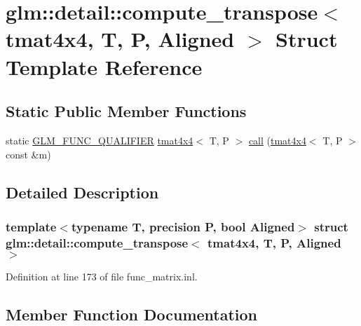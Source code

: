 \hypertarget{structglm_1_1detail_1_1compute__transpose_3_01tmat4x4_00_01_t_00_01_p_00_01_aligned_01_4}{}\section{glm\+::detail\+::compute\+\_\+transpose$<$ tmat4x4, T, P, Aligned $>$ Struct Template Reference}
\label{structglm_1_1detail_1_1compute__transpose_3_01tmat4x4_00_01_t_00_01_p_00_01_aligned_01_4}
\subsection*{Static Public Member Functions}
\begin{DoxyCompactItemize}
\item 
static \mbox{\hyperlink{setup_8hpp_a33fdea6f91c5f834105f7415e2a64407}{G\+L\+M\+\_\+\+F\+U\+N\+C\+\_\+\+Q\+U\+A\+L\+I\+F\+I\+ER}} \mbox{\hyperlink{structglm_1_1tmat4x4}{tmat4x4}}$<$ T, P $>$ \mbox{\hyperlink{structglm_1_1detail_1_1compute__transpose_3_01tmat4x4_00_01_t_00_01_p_00_01_aligned_01_4_a74c86f68f3e98893acab5d4b504df64c}{call}} (\mbox{\hyperlink{structglm_1_1tmat4x4}{tmat4x4}}$<$ T, P $>$ const \&m)
\end{DoxyCompactItemize}


\subsection{Detailed Description}
\subsubsection*{template$<$typename T, precision P, bool Aligned$>$\newline
struct glm\+::detail\+::compute\+\_\+transpose$<$ tmat4x4, T, P, Aligned $>$}



Definition at line 173 of file func\+\_\+matrix.\+inl.



\subsection{Member Function Documentation}
\mbox{\label{structglm_1_1detail_1_1compute__transpose_3_01tmat4x4_00_01_t_00_01_p_00_01_aligned_01_4_a74c86f68f3e98893acab5d4b504df64c}} 
